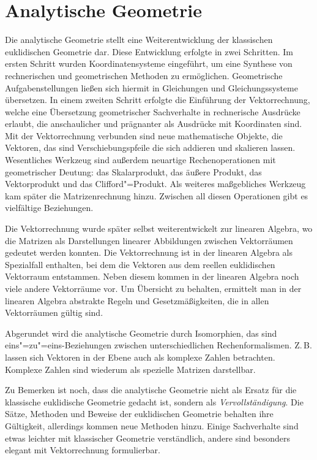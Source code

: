 
\chapter{Analytische Geometrie}

Die analytische Geometrie stellt eine Weiterentwicklung der
klassischen euklidischen Geometrie dar. Diese Entwicklung erfolgte
in zwei Schritten. Im ersten Schritt wurden Koordinatensysteme
eingeführt, um eine Synthese von rechnerischen und geometrischen
Methoden zu ermöglichen. Geometrische Aufgabenstellungen ließen
sich hiermit in Gleichungen und Gleichungssysteme übersetzen.
In einem zweiten Schritt erfolgte die Einführung der Vektorrechnung,
welche eine Übersetzung geometrischer Sachverhalte in rechnerische
Ausdrücke erlaubt, die anschaulicher und prägnanter als Ausdrücke
mit Koordinaten sind. Mit der Vektorrechnung verbunden sind neue
mathematische Objekte, die Vektoren, das sind Verschiebungspfeile
die sich addieren und skalieren lassen. Wesentliches Werkzeug sind
außerdem neuartige Rechenoperationen mit geometrischer Deutung: das
Skalarprodukt, das äußere Produkt, das Vektorprodukt
und das Clifford"=Produkt. Als weiteres maßgebliches Werkzeug kam
später die Matrizenrechnung hinzu. Zwischen all diesen Operationen
gibt es vielfältige Beziehungen.

Die Vektorrechnung wurde später selbst weiterentwickelt zur linearen
Algebra, wo die Matrizen als Darstellungen linearer Abbildungen
zwischen Vektorräumen gedeutet werden konnten. Die Vektorrechnung
ist in der linearen Algebra als Spezialfall enthalten, bei dem die
Vektoren aus dem reellen euklidischen Vektorraum entstammen.
Neben diesem kommen in der linearen Algebra noch viele andere
Vektorräume vor. Um Übersicht zu behalten, ermittelt man in der
linearen Algebra abstrakte Regeln und Gesetzmäßigkeiten, die in allen
Vektorräumen gültig sind.

Abgerundet wird die analytische Geometrie durch Isomorphien,
das sind eins"=zu"=eins-Beziehungen zwischen unterschiedlichen
Rechenformalismen. Z.\,B. lassen sich Vektoren in der Ebene auch als
komplexe Zahlen betrachten. Komplexe Zahlen sind wiederum als
spezielle Matrizen darstellbar.

Zu Bemerken ist noch, dass die analytische Geometrie nicht
als Ersatz für die klassische euklidische Geometrie gedacht ist,
sondern als \emph{Vervollständigung}. Die Sätze, Methoden und Beweise
der euklidischen Geometrie behalten ihre Gültigkeit, allerdings
kommen neue Methoden hinzu. Einige Sachverhalte sind etwas leichter
mit klassischer Geometrie verständlich, andere sind besonders
elegant mit Vektorrechnung formulierbar.

